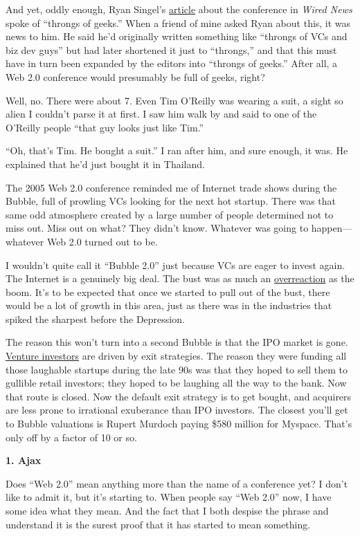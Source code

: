 And yet, oddly enough, Ryan Singel's
\href{http://www.wired.com/news/technology/0,1282,69114,00.html}{article}
about the conference in \emph{Wired News} spoke of ``throngs of geeks.''
When a friend of mine asked Ryan about this, it was news to him. He said
he'd originally written something like ``throngs of VCs and biz dev
guys'' but had later shortened it just to ``throngs,'' and that this
must have in turn been expanded by the editors into ``throngs of
geeks.'' After all, a Web 2.0 conference would presumably be full of
geeks, right?

Well, no. There were about 7. Even Tim O'Reilly was wearing a suit, a
sight so alien I couldn't parse it at first. I saw him walk by and said
to one of the O'Reilly people ``that guy looks just like Tim.''

``Oh, that's Tim. He bought a suit.'' I ran after him, and sure enough,
it was. He explained that he'd just bought it in Thailand.

The 2005 Web 2.0 conference reminded me of Internet trade shows during
the Bubble, full of prowling VCs looking for the next hot startup. There
was that same odd atmosphere created by a large number of people
determined not to miss out. Miss out on what? They didn't know. Whatever
was going to happen---whatever Web 2.0 turned out to be.

I wouldn't quite call it ``Bubble 2.0'' just because VCs are eager to
invest again. The Internet is a genuinely big deal. The bust was as much
an \href{http://www.paulgraham.com/bubble.html}{overreaction} as the
boom. It's to be expected that once we started to pull out of the bust,
there would be a lot of growth in this area, just as there was in the
industries that spiked the sharpest before the Depression.

The reason this won't turn into a second Bubble is that the IPO market
is gone. \href{startupfunding.html}{Venture investors} are driven by
exit strategies. The reason they were funding all those laughable
startups during the late 90s was that they hoped to sell them to
gullible retail investors; they hoped to be laughing all the way to the
bank. Now that route is closed. Now the default exit strategy is to get
bought, and acquirers are less prone to irrational exuberance than IPO
investors. The closest you'll get to Bubble valuations is Rupert Murdoch
paying \$580 million for Myspace. That's only off by a factor of 10 or
so.

\textbf{1. Ajax}

Does ``Web 2.0'' mean anything more than the name of a conference yet? I
don't like to admit it, but it's starting to. When people say ``Web
2.0'' now, I have some idea what they mean. And the fact that I both
despise the phrase and understand it is the surest proof that it has
started to mean something.

